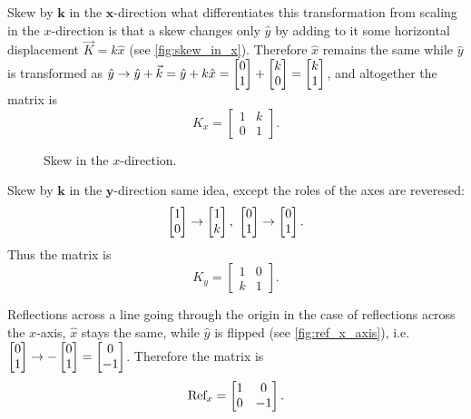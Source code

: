 \begin{descitemize}
	\item[Skew by $\bm{k}$ in the $\bm{x}$-direction] what differentiates this transformation from scaling in the $x$-direction is that a skew changes only $\hat{y}$ by adding to it some horizontal displacement $\vec{K}=k\hat{x}$ (see \autoref{fig:skew_in_x}). Therefore $\hat{x}$ remains the same while $\hat{y}$ is transformed as $\hat{y}\to\hat{y}+\vec{k}=\hat{y}+k\hat{x}=\colvec{0;1}+\colvec{k;0}=\colvec{k;1}$, and altogether the matrix is
		\begin{equation}
			K_{x} = \begin{bmatrix} 1&k \\ 0&1 \end{bmatrix}.
			\label{eq:}
		\end{equation}
		
		\begin{figure}
			\centering
			\caption{Skew in the $x$-direction.}
			\label{fig:skew_in_x}
		\end{figure}

	\item[Skew by $\bm{k}$ in the $\bm{y}$-direction] same idea, except the roles of the axes are reveresed:
		\[
			\colvec{1;0}\to\colvec{1;k},\ \colvec{0;1}\to\colvec{0;1}.
		\]
		Thus the matrix is
		\begin{equation}
			K_{y} = \begin{bmatrix} 1&0 \\ k&1 \end{bmatrix}.
			\label{eq:}
		\end{equation}

	\item[Reflections across a line going through the origin] in the case of reflections across the $x$-axis, $\hat{x}$ stays the same, while $\hat{y}$ is flipped (see \autoref{fig:ref_x_axis}), i.e. $\colvec{0;1}\to-\colvec{0;1}=\colvec{0;-1}$. Therefore the matrix is
		\begin{equation}
			\text{Ref}_{x} = \begin{bmatrix} 1&0 \\ 0&-1 \end{bmatrix}.
		\end{equation}
		

\end{descitemize}
